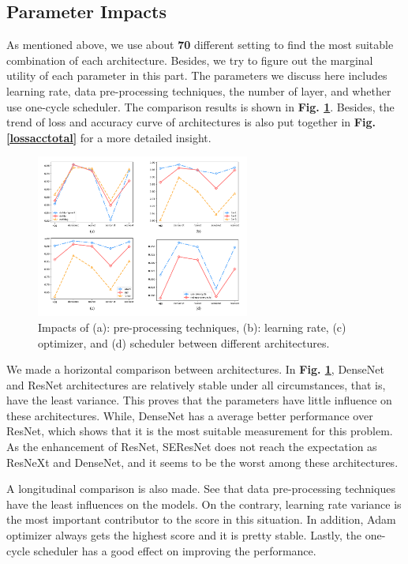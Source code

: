 \documentclass[10pt,twocolumn,letterpaper]{article}
\begin{document}
\subsection{Parameter Impacts}

As mentioned above, we use about \textbf{70} different setting to find the most suitable combination of each architecture. Besides, we try to figure out the marginal utility of each parameter in this part. The parameters we discuss here includes learning rate, data pre-processing techniques, the number of layer, and whether use one-cycle scheduler. The comparison results is shown in \textbf{Fig. \ref{impacttotal}}. Besides, the trend of loss and accuracy curve of architectures is also put together in \textbf{Fig. \ref{lossacctotal}} for a more detailed insight.

\begin{figure}[h]
\centering
\includegraphics[width=7cm]{impact_total.pdf}
\caption{Impacts of (a): pre-processing techniques, (b): learning rate, (c) optimizer, and (d) scheduler between different architectures.}
\label{impacttotal}
\end{figure}

We made a horizontal comparison between architectures. In \textbf{Fig. \ref{impacttotal}}, \textsf{DenseNet} and \textsf{ResNet} architectures are relatively stable under all circumstances, that is, have the least variance. This proves that the parameters have little influence on these architectures. While, \textsf{DenseNet} has a average better performance over \textsf{ResNet}, which shows that it is the most suitable measurement for this problem. As the enhancement of \textsf{ResNet}, \textsf{SEResNet} does not reach the expectation as \textsf{ResNeXt} and \textsf{DenseNet}, and it seems to be the worst among these architectures. 

A longitudinal comparison is also made. See that data pre-processing techniques have the least influences on the models. On the contrary, learning rate variance is the most important contributor to the score in this situation. In addition, Adam optimizer always gets the highest score and it is pretty stable. Lastly, the one-cycle scheduler has a good effect on improving the performance.
\end{document}
